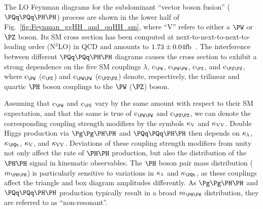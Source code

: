 The LO Feynman diagrams for the subdominant ``vector boson fusion'' ($\qqHH$) process are shown in the lower half of Fig.~\ref{fig:Feynman_ggHH_and_qqHH_sm},
where ``V'' refers to either a $\PW$ or $\PZ$ boson.
Its SM cross section has been computed at next-to-next-to-next-to-leading order (N$^{3}$LO) in QCD
and amounts to $1.73 \pm 0.04\text{fb}$~\cite{Dreyer:2018qbw}.
The interference between different $\qqHH$ diagrams causes the cross section to exhibit a strong dependence on the five SM couplings
$\lambda$, $\cW$, $\cWW$, $\cZ$, and $\cZZ$,
where $\cW$ ($\cZ$) and $\cWW$ ($\cZZ$) denote, respectively, the trilinear and quartic $\PHiggs$ boson couplings to the $\PW$ ($\PZ$) boson.

Assuming that $\cW$ and $\cZ$ vary by the same amount with respect to their SM expectation, and that the same is true of $\cWW$ and $\cZZ$,
we can denote the corresponding coupling strength modifiers by the symbols $\kappa_{\textrm{V}}$ and $\kappa_{\textrm{V}\textrm{V}}$. Double Higgs
production via $\ggHH$ and $\qqHH$ then depends on $\kappa_{\lambda}$, $\kappat$, $\kappa_{\textrm{V}}$, and $\kappa_{\textrm{V}\textrm{V}}$.
Deviations of these coupling strength modifiers from unity not only affect the rate of $\HH$ production,
but also the distribution of the $\HH$ signal in kinematic observables.
The $\PHiggs$ boson pair mass distribution ($\mHH$) is particularly sensitive to variations in $\kappa_{\lambda}$ and $\kappat$,
as these couplings affect the triangle and box diagram amplitudes differently.
As $\ggHH$ and $\qqHH$ production typically result in a broad $\mHH$ distribution,
they are referred to as ``non-resonant''.

